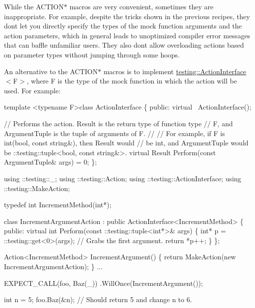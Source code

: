 While the {\ttfamily A\+C\+T\+I\+O\+N$\ast$} macros are very convenient, sometimes they are inappropriate. For example, despite the tricks shown in the previous recipes, they don\textquotesingle{}t let you directly specify the types of the mock function arguments and the action parameters, which in general leads to unoptimized compiler error messages that can baffle unfamiliar users. They also don\textquotesingle{}t allow overloading actions based on parameter types without jumping through some hoops.

An alternative to the {\ttfamily A\+C\+T\+I\+O\+N$\ast$} macros is to implement {\ttfamily \hyperlink{classtesting_1_1ActionInterface}{testing\+::\+Action\+Interface}$<$F$>$}, where {\ttfamily F} is the type of the mock function in which the action will be used. For example\+:


\begin{DoxyCode}
\textcolor{keyword}{template} <\textcolor{keyword}{typename} F>\textcolor{keyword}{class }ActionInterface \{
 \textcolor{keyword}{public}:
  \textcolor{keyword}{virtual} ~ActionInterface();

  \textcolor{comment}{// Performs the action.  Result is the return type of function type}
  \textcolor{comment}{// F, and ArgumentTuple is the tuple of arguments of F.}
  \textcolor{comment}{//}
  \textcolor{comment}{// For example, if F is int(bool, const string&), then Result would}
  \textcolor{comment}{// be int, and ArgumentTuple would be ::testing::tuple<bool, const string&>.}
  \textcolor{keyword}{virtual} Result Perform(\textcolor{keyword}{const} ArgumentTuple& args) = 0;
\};

using ::testing::\_;
using ::testing::Action;
using ::testing::ActionInterface;
using ::testing::MakeAction;

\textcolor{keyword}{typedef} \textcolor{keywordtype}{int} IncrementMethod(\textcolor{keywordtype}{int}*);

\textcolor{keyword}{class }IncrementArgumentAction : \textcolor{keyword}{public} ActionInterface<IncrementMethod> \{
 \textcolor{keyword}{public}:
  \textcolor{keyword}{virtual} \textcolor{keywordtype}{int} Perform(const ::testing::tuple<int*>& args) \{
    \textcolor{keywordtype}{int}* p = ::testing::get<0>(args);  \textcolor{comment}{// Grabs the first argument.}
    \textcolor{keywordflow}{return} *p++;
  \}
\};

Action<IncrementMethod> IncrementArgument() \{
  \textcolor{keywordflow}{return} MakeAction(\textcolor{keyword}{new} IncrementArgumentAction);
\}
...

  EXPECT\_CALL(foo, Baz(\_))
      .WillOnce(IncrementArgument());

  \textcolor{keywordtype}{int} n = 5;
  foo.Baz(&n);  \textcolor{comment}{// Should return 5 and change n to 6.}
\end{DoxyCode}


